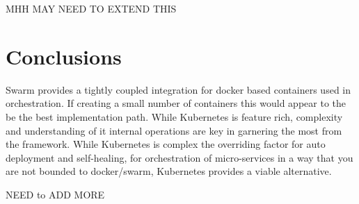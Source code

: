 \documentclass{article}
\begin{document}
\par
MHH MAY NEED TO EXTEND THIS










\lipsum[1]

\section{Conclusions}
\parseint
Swarm provides a tightly coupled integration for docker based containers used in orchestration. If creating a small number of containers this would appear to the be the best implementation path. While Kubernetes is feature rich, complexity and understanding of it internal operations are key in garnering the most from the framework. While Kubernetes is complex the overriding factor for auto deployment and self-healing, for orchestration of micro-services in a way that you are not bounded to docker/swarm, Kubernetes provides a viable alternative.
\par
NEED to ADD MORE
\lipsum[1]


\vspace{-7.5mm}
\renewcommand{\refname}{\section{References}}

\end{document}
